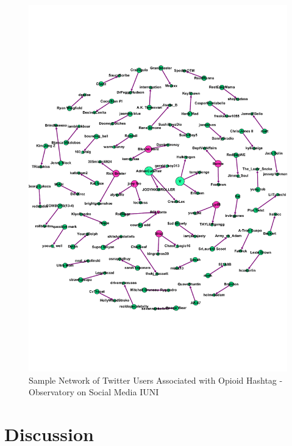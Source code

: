 \documentclass[sigconf]{acmart}
\begin{document}
\begin{figure}[!ht]
  \centering\includegraphics[width=\columnwidth]{images/Figure9.pdf}
  \caption{Sample Network of Twitter Users Associated with Opioid Hashtag - 
  Observatory on Social Media IUNI}
  \label{f:Figure9}
\end{figure}

\section{Discussion}
\end{document}
